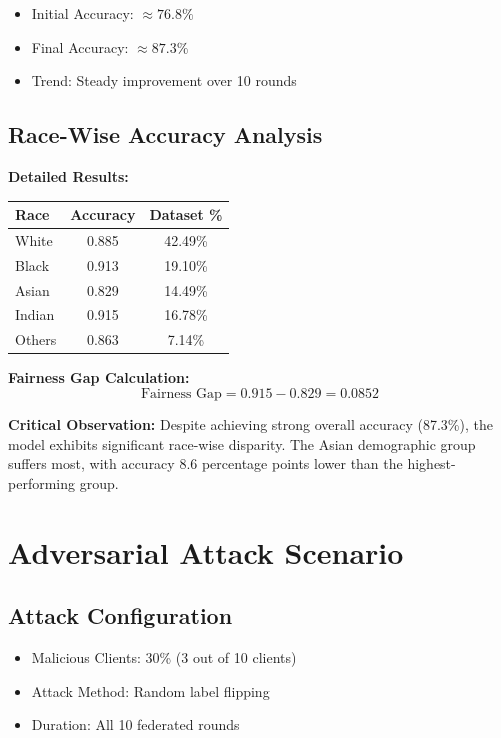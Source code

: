 \documentclass[11pt,a4paper]{report}
\begin{document}
\begin{itemize}
    \item Initial Accuracy: $\approx 76.8\%$
    \item Final Accuracy: $\approx 87.3\%$
    \item Trend: Steady improvement over 10 rounds
\end{itemize}

\subsection{Race-Wise Accuracy Analysis}

\textbf{Detailed Results:}
\begin{table}[h]
\centering
\begin{tabular}{lcc}
\toprule
\textbf{Race} & \textbf{Accuracy} & \textbf{Dataset \%} \\
\midrule
White & 0.885 & 42.49\% \\
Black & 0.913 & 19.10\% \\
Asian & 0.829 & 14.49\% \\
Indian & 0.915 & 16.78\% \\
Others & 0.863 & 7.14\% \\
\bottomrule
\end{tabular}
\end{table}

\textbf{Fairness Gap Calculation:}
\begin{equation}
\text{Fairness Gap} = 0.915 - 0.829 = 0.0852
\end{equation}

\textbf{Critical Observation:} Despite achieving strong overall accuracy (87.3\%), the model exhibits significant race-wise disparity. The Asian demographic group suffers most, with accuracy 8.6 percentage points lower than the highest-performing group.

\section{Adversarial Attack Scenario}

\subsection{Attack Configuration}

\begin{itemize}
    \item Malicious Clients: 30\% (3 out of 10 clients)
    \item Attack Method: Random label flipping
    \item Duration: All 10 federated rounds
\end{itemize}
\end{document}
